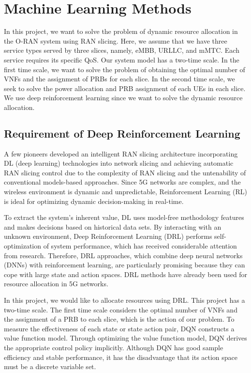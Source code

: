 \documentclass{article}
\begin{document}
\section{Machine Learning Methods}
In this project, we want to solve the problem of dynamic resource allocation in the O-RAN system using RAN slicing. Here, we assume that we have three service types served by three slices, namely, eMBB, URLLC, and mMTC. Each service requires its specific QoS.
Our system model has a two-time scale. In the first time scale, we want to solve the problem of obtaining the optimal number of VNFs and the assignment of PRBs for each slice. In the second time scale, we seek to solve the power allocation and PRB assignment of each UEs in each slice. We use deep reinforcement learning since we want to solve the dynamic resource allocation.

\subsection{Requirement of Deep Reinforcement Learning}
A few pioneers developed an intelligent RAN slicing architecture incorporating DL (deep learning) technologies into network slicing and achieving automatic RAN slicing control due to the complexity of RAN slicing and the untenability of conventional models-based approaches. 
Since 5G networks are complex, and the wireless environment is dynamic and unpredictable, Reinforcement Learning (RL) is ideal for optimizing dynamic decision-making in real-time.

To extract the system's inherent value, DL uses model-free methodology features and makes decisions based on historical data sets. 
By interacting with an unknown environment, Deep Reinforcement Learning (DRL) performs self-optimization of system performance, which has received considerable attention from research.
Therefore, DRL approaches, which combine deep neural networks (DNNs) with reinforcement learning, are particularly promising because they can cope with large state and action spaces.
DRL methods have already been used for resource allocation in 5G networks.

In this project, we would like to allocate resources using DRL. This project has a two-time scale. The first time scale considers the optimal number of VNFs and the assignment of a PRB to each slice, which is the action of our problem.
To measure the effectiveness of each state or state action pair, DQN constructs a value function model. Through optimizing the value function model, DQN derives the appropriate control policy implicitly. Although DQN has good sample efficiency and stable performance, it has the disadvantage that its action space must be a discrete variable set. 
\end{document}
